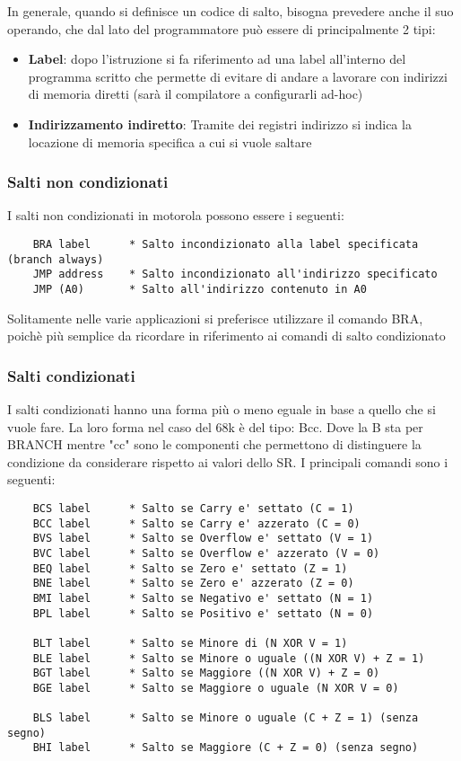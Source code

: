 In generale, quando si definisce un codice di salto, bisogna prevedere anche il suo operando, che dal lato del programmatore può essere di principalmente 2 tipi:
\begin{itemize}
    \item \textbf{Label}: dopo l'istruzione si fa riferimento ad una label all'interno del programma scritto che permette di evitare di andare a lavorare con indirizzi di memoria diretti (sarà il compilatore a configurarli ad-hoc)
    
    \item \textbf{Indirizzamento indiretto}: Tramite dei registri indirizzo si indica la locazione di memoria specifica a cui si vuole saltare
\end{itemize}

\newpage
\subsubsection{Salti non condizionati}
I salti non condizionati in motorola possono essere i seguenti:
\begin{lstlisting}
    BRA label      * Salto incondizionato alla label specificata (branch always)
    JMP address    * Salto incondizionato all'indirizzo specificato
    JMP (A0)       * Salto all'indirizzo contenuto in A0
\end{lstlisting}

Solitamente nelle varie applicazioni si preferisce utilizzare il comando BRA, poichè più semplice da ricordare in riferimento ai comandi di salto condizionato

\subsubsection{Salti condizionati}
I salti condizionati hanno una forma più o meno eguale in base a quello che si vuole fare. La loro forma nel caso del 68k è del tipo: Bcc. Dove la B sta per BRANCH mentre "cc" sono le componenti che permettono di distinguere la condizione da considerare rispetto ai valori dello SR.
I principali comandi sono i seguenti:
\begin{lstlisting}
    BCS label      * Salto se Carry e' settato (C = 1)
    BCC label      * Salto se Carry e' azzerato (C = 0)
    BVS label      * Salto se Overflow e' settato (V = 1)
    BVC label      * Salto se Overflow e' azzerato (V = 0)
    BEQ label      * Salto se Zero e' settato (Z = 1)
    BNE label      * Salto se Zero e' azzerato (Z = 0)
    BMI label      * Salto se Negativo e' settato (N = 1)
    BPL label      * Salto se Positivo e' settato (N = 0)

    BLT label      * Salto se Minore di (N XOR V = 1)
    BLE label      * Salto se Minore o uguale ((N XOR V) + Z = 1)
    BGT label      * Salto se Maggiore ((N XOR V) + Z = 0)
    BGE label      * Salto se Maggiore o uguale (N XOR V = 0)

    BLS label      * Salto se Minore o uguale (C + Z = 1) (senza segno)
    BHI label      * Salto se Maggiore (C + Z = 0) (senza segno)
\end{lstlisting}


